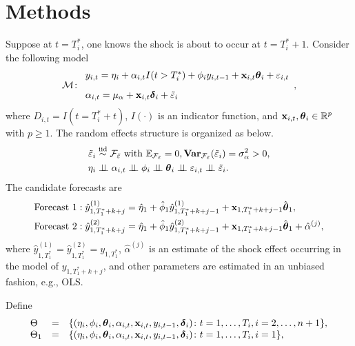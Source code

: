 \documentclass[12pt]{article}
\begin{document}
\section{Methods}

Suppose at $t=T_i^*$, one knows the shock is about to occur at $t=T_i^*+1$. Consider the following model
\begin{align*}
  \mathcal{M} \colon 
  \begin{array}{l}
    y_{i,t} = \eta_i +  \alpha_{i,t}I(t > T_i^*)+ \phi_i y_{i,t-1} + \mathbf{x}_{i,t}\boldsymbol{\theta}_i + \varepsilon_{i,t}\\[.3cm]
    \alpha_{i,t} = \mu_{\alpha} + \mathbf{x}_{i, t}\boldsymbol{\delta}_i + \tilde{\varepsilon}_i
  \end{array},
\end{align*}
where $D_{i,t}= I(t= T_i^* +t)$, $I(\cdot)$ is an indicator function, and $\mathbf{x}_{i,t}, \boldsymbol{\theta}_{i}\in \mathbb{R}^p$ with $p\geq 1$. The random effects structure is organized as below.
\begin{align*}
  \tilde{\varepsilon}_i &\simiid \mc{F}_{\tilde{\varepsilon}} \text{ with } \E_{\mc{F}_{\tilde{\varepsilon}}} = 0, \Var_{\mc{F}_{\tilde{\varepsilon}}}(\tilde{\varepsilon}_i)= \sigma^2_{\alpha}  >0, \\
  \eta_i & \indep \alpha_{i,t} \indep \phi_i \indep \boldsymbol{\theta}_i \indep \varepsilon_{i,t} \indep \tilde{\varepsilon}_i.
\end{align*}
The candidate forecasts are
\begin{align*}
  &\text{Forecast 1}: \hat{y}_{1,T_1^*+k + j}^{(1)} = \hat\eta_1 
    + \hat\phi_1 \hat{y}^{(1)}_{1,T_1^*+k+j-1} + \mathbf{x}_{1,T_1^*+k+j-1} \hat{\boldsymbol{\theta}}_1
    , \\
  &\text{Forecast 2}: \hat{y}_{1,T_1^*+k+j}^{(2)} = \hat\eta_1 
    + \hat\phi_1 \hat{y}^{(2)}_{1,T_1^*+k+j-1} + \mathbf{x}_{1,T_1^*+k+j-1} \hat{\boldsymbol{\theta}}_1
    + \hat{\alpha}^{(j)},
\end{align*}
where $\hat{y}_{1, T_1^*}^{(1)}=\hat{y}_{1, T_1^*}^{(2)}=y_{1,T_1^*}$, $\hat{\alpha}^{(j)}$ is an estimate of the shock effect occurring in the model of $y_{1,T_1^*+k+j}$, and other parameters are estimated in an unbiased fashion, e.g., OLS. 


Define
\begin{align}
  \begin{array}{lll}
     \Theta &= &\{(\eta_i, \phi_i, \boldsymbol{\theta}_i, \alpha_{i,t}, \mathbf{x}_{i,t}, y_{i,t-1}, \boldsymbol{\delta}_i)\colon t= 1, \ldots, T_i, i = 2, \ldots, n +1\},\\
    \Theta_1 &= &\{(\eta_i, \phi_i, \boldsymbol{\theta}_i, \alpha_{i,t}, \mathbf{x}_{i,t}, y_{i,t-1}, \boldsymbol{\delta}_i)\colon t= 1, \ldots, T_i, i = 1\},\label{parameter}
  \end{array}
\end{align}
\end{document}
